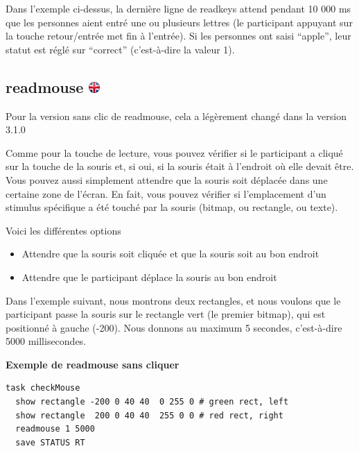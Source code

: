 \documentclass[
]{book}
\providecommand{\tightlist}{%
  \setlength{\itemsep}{0pt}\setlength{\parskip}{0pt}}
\begin{document}
Dans l'exemple ci-dessus, la dernière ligne de readkeys attend pendant 10 000 ms que les personnes aient entré une ou plusieurs lettres (le participant appuyant sur la touche retour/entrée met fin à l'entrée). Si les personnes ont saisi ``apple'', leur statut est réglé sur ``correct'' (c'est-à-dire la valeur 1).

\hypertarget{readmouse}{%
\subsection[readmouse ]{\texorpdfstring{readmouse \href{https://www.psytoolkit.org/doc3.2.0/syntax.html\#task-readmouse}{\protect\includegraphics{img/ukflag.png}}}{readmouse }}\label{readmouse}}

Pour la version sans clic de readmouse, cela a légèrement changé dans la version 3.1.0

Comme pour la touche de lecture, vous pouvez vérifier si le participant a cliqué sur la touche de la souris et, si oui, si la souris était à l'endroit où elle devait être. Vous pouvez aussi simplement attendre que la souris soit déplacée dans une certaine zone de l'écran. En fait, vous pouvez vérifier si l'emplacement d'un stimulus spécifique a été touché par la souris (bitmap, ou rectangle, ou texte).

Voici les différentes options

\begin{itemize}
\tightlist
\item
  Attendre que la souris soit cliquée et que la souris soit au bon endroit
\item
  Attendre que le participant déplace la souris au bon endroit
\end{itemize}

Dans l'exemple suivant, nous montrons deux rectangles, et nous voulons que le participant passe la souris sur le rectangle vert (le premier bitmap), qui est positionné à gauche (-200). Nous donnons au maximum 5 secondes, c'est-à-dire 5000 millisecondes.

\textbf{Exemple de readmouse sans cliquer}

\begin{verbatim}
task checkMouse
  show rectangle -200 0 40 40  0 255 0 # green rect, left
  show rectangle  200 0 40 40  255 0 0 # red rect, right
  readmouse 1 5000
  save STATUS RT
\end{verbatim}
\end{document}
